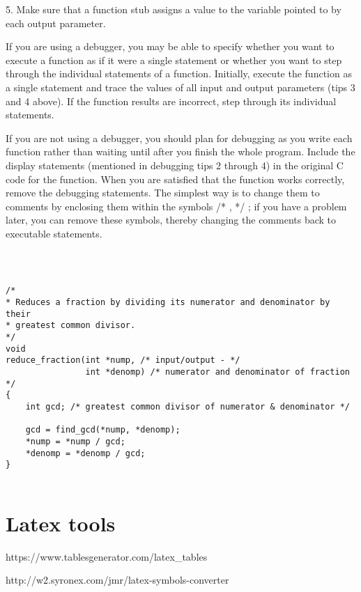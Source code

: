 \documentclass{extarticle}
\begin{document}
5. Make sure that a function stub assigns a value to the variable pointed to by each output parameter.



If you are using a debugger, you may be able to specify whether you want to execute a function as if it were a single statement or whether you want to step through the individual statements of a function. Initially, execute the function as a single statement and trace the values of all input and output parameters (tips 3 and 4 above). If the function results are incorrect, step through its individual statements.

If you are not using a debugger, you should plan for debugging as you write each function rather than waiting until after you finish the whole program. Include the display statements (mentioned in debugging tips 2 through 4) in the original C code for the function. When you are satisfied that the function works correctly, remove the debugging statements. The simplest way is to change them to comments by enclosing them within the symbols /* , */ ; if you have a problem later, you can remove these symbols, thereby changing the comments back to executable statements.








\begin{verbatim}



/*
* Reduces a fraction by dividing its numerator and denominator by their
* greatest common divisor.
*/
void
reduce_fraction(int *nump, /* input/output - */
                int *denomp) /* numerator and denominator of fraction */
{
    int gcd; /* greatest common divisor of numerator & denominator */

    gcd = find_gcd(*nump, *denomp);
    *nump = *nump / gcd;
    *denomp = *denomp / gcd;
}


\end{verbatim}










\section{Latex tools}

https://www.tablesgenerator.com/latex\_tables

http://w2.syronex.com/jmr/latex-symbols-converter
\end{document}
